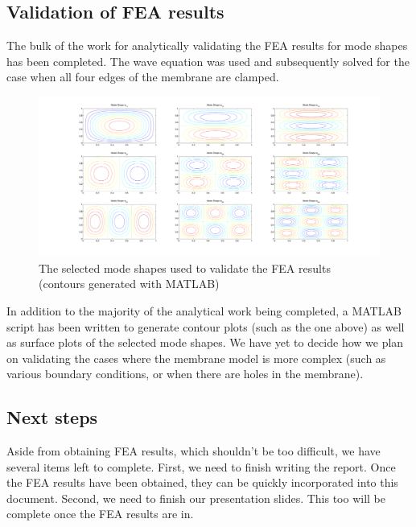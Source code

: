 \documentclass[10pt]{article}
\begin{document}
\subsection*{Validation of FEA results}
The bulk of the work for analytically validating the FEA results for mode shapes has been completed.  The wave equation was used and subsequently solved for the case when all four edges of the membrane are clamped.
\begin{figure}[h]
	\centering
	\includegraphics[width=\textwidth]{modes}
	\caption{The selected mode shapes used to validate the FEA results (contours generated with MATLAB)}
\end{figure}
In addition to the majority of the analytical work being completed, a MATLAB script has been written to generate contour plots (such as the one above) as well as surface plots of the selected mode shapes.  We have yet to decide how we plan on validating the cases where the membrane model is more complex (such as various boundary conditions, or when there are holes in the membrane).

\subsection*{Next steps}
Aside from obtaining FEA results, which shouldn't be too difficult, we have several items left to complete.  First, we need to finish writing the report.  Once the FEA results have been obtained, they can be quickly incorporated into this document.  Second, we need to finish our presentation slides.  This too will be complete once the FEA results are in.
\end{document}
